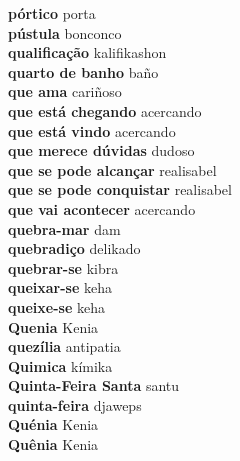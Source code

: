\textbf{ pórtico  } porta \\
\textbf{ pústula  } bonconco \\
\textbf{ qualificação  } kalifikashon \\
\textbf{ quarto de banho  } baño \\
\textbf{ que ama  } cariñoso \\
\textbf{ que está chegando  } acercando \\
\textbf{ que está vindo  } acercando \\
\textbf{ que merece dúvidas  } dudoso \\
\textbf{ que se pode alcançar  } realisabel \\
\textbf{ que se pode conquistar  } realisabel \\
\textbf{ que vai acontecer  } acercando \\
\textbf{ quebra-mar  } dam \\
\textbf{ quebradiço  } delikado \\
\textbf{ quebrar-se  } kibra \\
\textbf{ queixar-se  } keha \\
\textbf{ queixe-se  } keha \\
\textbf{ Quenia  } Kenia \\
\textbf{ quezília  } antipatia \\
\textbf{ Quimica  } kímika \\
\textbf{ Quinta-Feira Santa  } santu \\
\textbf{ quinta-feira  } djaweps \\
\textbf{ Quénia  } Kenia \\
\textbf{ Quênia  } Kenia \\
